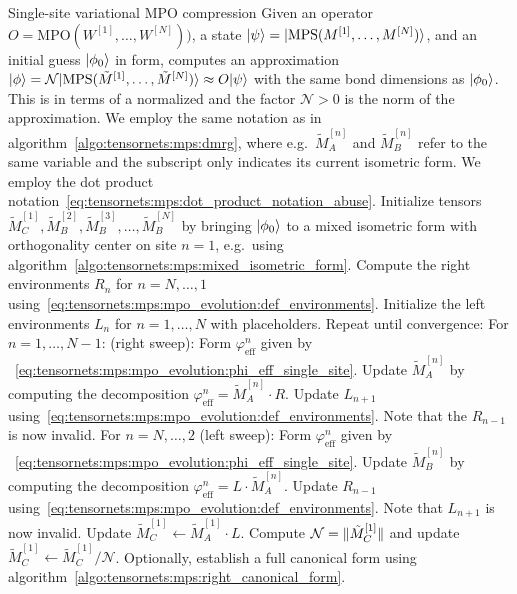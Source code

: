 \begin{Algorithm}{Single-site variational MPO compression}{
    Given an operator $O = \text{MPO}(W^{[1]}, \dots, W^{[N]}))$, a state $\psiket = \ket{\text{MPS}(M^{[1]}, \dots, M^{[N]})}$, and an initial guess $\ket{\phi_0}$ in  form, computes an  approximation $\ket{\phi} = \mathcal{N} \ket{\text{MPS}(\tilde{M}^{[1]}, \dots, \tilde{M}^{[N]})} \approx O\psiket$ with the same bond dimensions as $\ket{\phi_0}$.
    This is in terms of a normalized  and the factor $\mathcal{N} > 0$ is the norm of the approximation.
    We employ the same notation as in algorithm~\ref{algo:tensornets:mps:dmrg}, where e.g.~$\tilde{M}^{[n]}_A$ and $\tilde{M}^{[n]}_B$ refer to the same variable and the subscript only indicates its current isometric form.
    We employ the dot product notation~\eqref{eq:tensornets:mps:dot_product_notation_abuse}.
    \label{algo:tensornets:mps:mpo_evolution_single_site}
}
    \step Initialize  tensors $\tilde{M}_C^{[1]}, \tilde{M}_B^{[2]}, \tilde{M}_B^{[3]}, \dots, \tilde{M}_B^{[N]}$ by bringing $\ket{\phi_0}$ to a mixed isometric form with orthogonality center on site $n=1$, e.g.~using algorithm~\ref{algo:tensornets:mps:mixed_isometric_form}.
    \step Compute the right environments $R_n$ for $n=N,\dots, 1$ using~\eqref{eq:tensornets:mps:mpo_evolution:def_environments}.
    \step Initialize the left environments $L_n$ for $n=1, \dots, N$ with placeholders.
    \step Repeat until convergence:
    \step \quad For $n = 1, \dots , N-1$: (right sweep):
    \step \qquad Form $\varphi_\text{eff}^{n}$ given by ~\eqref{eq:tensornets:mps:mpo_evolution:phi_eff_single_site}.
    \step \qquad Update $\tilde{M}_A^{[n]}$ by computing the  decomposition $\varphi_\text{eff}^{n} = \tilde{M}_A^{[n]} \cdot R$.
    \step \qquad Update $L_{n+1}$ using~\eqref{eq:tensornets:mps:mpo_evolution:def_environments}. Note that the $R_{n-1}$ is now invalid.
    \step \quad For $n = N, \dots, 2$ (left sweep):
    \step \qquad Form $\varphi_\text{eff}^{n}$ given by ~\eqref{eq:tensornets:mps:mpo_evolution:phi_eff_single_site}.
    \step \qquad Update $\tilde{M}_B^{[n]}$ by computing the  decomposition $\varphi_\text{eff}^{n} = L \cdot \tilde{M}_A^{[n]}$.
    \step \qquad Update $R_{n-1}$ using~\eqref{eq:tensornets:mps:mpo_evolution:def_environments}. Note that $L_{n+1}$ is now invalid.
    \step \quad Update $\tilde{M}_C^{[1]} \gets \tilde{M}_A^{[1]} \cdot L$.
    \step \quad Compute $\mathcal{N} = \norm{\tilde{M}_C^{[1]}}$ and update $\tilde{M}_C^{[1]} \gets \tilde{M}_C^{[1]} / \mathcal{N}$.
    \step Optionally, establish a full canonical form using algorithm~\eqref{algo:tensornets:mps:right_canonical_form}.
\end{Algorithm}
